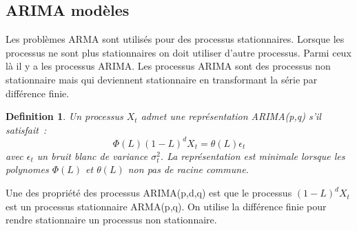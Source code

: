 \documentclass[11pt]{scrartcl} %
\newtheorem{Def}[theorem]{Definition}
\begin{document}
\subsection{ARIMA modèles}
Les problèmes ARMA sont utilisés pour des processus stationnaires. Lorsque les processus ne sont plus stationnaires on doit utiliser d'autre processus. Parmi ceux là il y a les processus ARIMA. Les processus ARIMA sont des processus non stationnaire mais qui deviennent stationnaire en transformant la série par différence finie.
\begin{Def}
Un processus $X_t$ admet une représentation ARIMA(p,q) s'il satisfait~:
$$
\Phi(L)(1-L)^dX_t=\theta(L)\epsilon_t
$$
avec $\epsilon_t$ un bruit blanc de variance $\sigma_t^2$. La représentation est minimale lorsque les polynomes $\Phi(L)$ et $\theta(L)$ non pas de racine commune.
\end{Def}
Une des propriété des processus ARIMA(p,d,q) est que le processus $(1-L)^dX_t$ est un processus stationnaire ARMA(p,q). On utilise la différence finie pour rendre stationnaire un processus non stationnaire.
\end{document}
